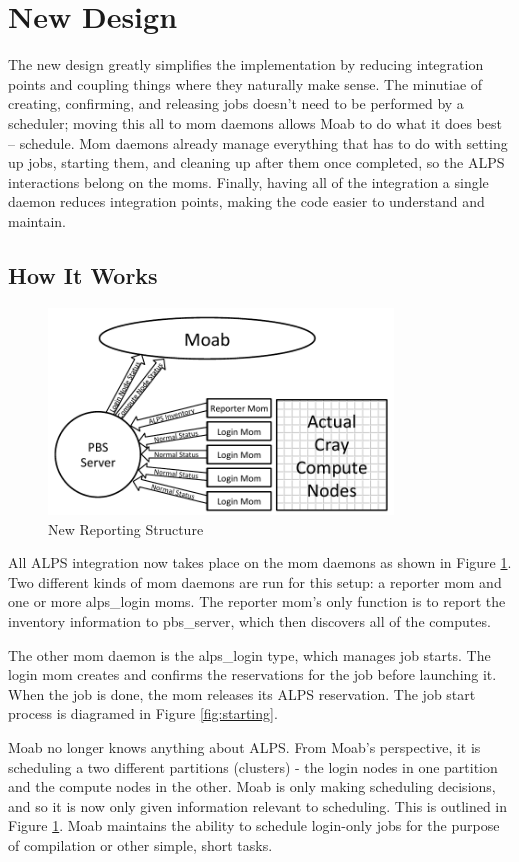 \section{New Design}

The new design greatly simplifies the implementation by reducing integration
points and coupling things where they naturally make sense. The minutiae of
creating, confirming, and releasing jobs doesn't need to be performed by a
scheduler; moving this all to mom daemons allows Moab to do what it does best –
schedule. Mom daemons already manage everything that has to do with setting up
jobs, starting them, and cleaning up after them once completed, so the ALPS
interactions belong on the moms. Finally, having all of the integration a
single daemon reduces integration points, making the code easier to understand
and maintain.

\subsection{How It Works}
\begin{figure}
  \centering
  \includegraphics[width=3.6in]{figures/new-diagram.pdf}
  \caption{New Reporting Structure}\label{fig:reporting}
\end{figure}

All ALPS integration now takes place on the mom daemons as shown in Figure
\ref{fig:reporting}. Two different kinds of mom daemons are run for this setup:
a reporter mom and one or more alps_login moms. The reporter mom's only
function is to report the inventory information to pbs_server, which then
discovers all of the computes.

The other mom daemon is the alps_login type, which manages job starts. The
login mom creates and confirms the reservations for the job before launching
it. When the job is done, the mom releases its ALPS reservation. The job start
process is diagramed in Figure \ref{fig:starting}.

Moab no longer knows anything about ALPS. From Moab's perspective, it is
scheduling a two different partitions (clusters) - the login nodes in one
partition and the compute nodes in the other. Moab is only making scheduling
decisions, and so it is now only given information relevant to scheduling. This
is outlined in Figure \ref{fig:reporting}. Moab maintains the ability to
schedule login-only jobs for the purpose of compilation or other simple, short
tasks.

